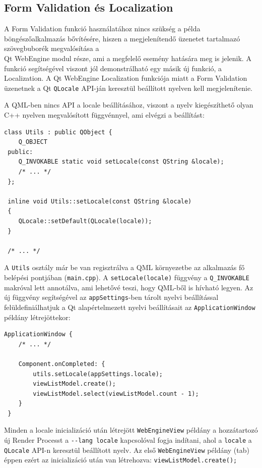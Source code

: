 \documentclass[12pt]{report}
\begin{document}
\newpage
\subsection{Form Validation és Localization}
A Form Validation funkció használatához nincs szükség a példa böngészőalkalmazás bővítésére,
hiszen a megjelenítendő üzenetet tartalmazó szövegbuborék megvalósítása a \\
Qt WebEngine modul része, ami a megfelelő esemény hatására meg is jelenik.
A funkció segítségével viszont jól demonstrálható egy másik új funkció, a Localization.
A Qt WebEngine Localization funkciója miatt a Form Validation üzenetnek a Qt \texttt{QLocale}
API-ján keresztül beállított nyelven kell megjelenítenie.

A QML-ben nincs API a locale beállításához, viszont a nyelv kiegészíthető olyan C++ nyelven
megvalósított függvénnyel, ami elvégzi a beállítást:
\begin{lstlisting}[title=utils.h]
 class Utils : public QObject {
    Q_OBJECT
 public:
    Q_INVOKABLE static void setLocale(const QString &locale);
    /* ... */
 };

 inline void Utils::setLocale(const QString &locale)
 {
    QLocale::setDefault(QLocale(locale));
 }

 /* ... */
\end{lstlisting}
A \texttt{Utils} osztály már be van regisztrálva a QML környezetbe az alkalmazás fő belépési
pontjában (\texttt{main.cpp}). A \texttt{setLocale(locale)} függvény a \texttt{Q\_INVOKABLE}
makróval lett annotálva, ami lehetővé teszi, hogy QML-ből is hívható legyen. Az új függvény
segítségével az \texttt{appSettings}-ben tárolt nyelvi beállítással felüldefiniálhatjuk a
Qt alapértelmezett nyelvi beállításait az \texttt{ApplicationWindow} példány létrejöttekor:
\begin{lstlisting}[title=main.qml]
 ApplicationWindow {
    /* ... */

    Component.onCompleted: {
        utils.setLocale(appSettings.locale);
        viewListModel.create();
        viewListModel.select(viewListModel.count - 1);
    }
 }
\end{lstlisting}
Minden a locale inicializáció után létrejött \texttt{WebEngineView} példány a hozzátartozó
új Render Processt a \texttt{-{}-lang locale} kapcsolóval fogja indítani, ahol a
\texttt{locale} a \texttt{QLocale} API-n keresztül beállított nyelv. Az első
\texttt{WebEngineView} példány (tab) éppen ezért az inicializáció után van létrehozva:
\texttt{viewListModel.create();}
\end{document}
